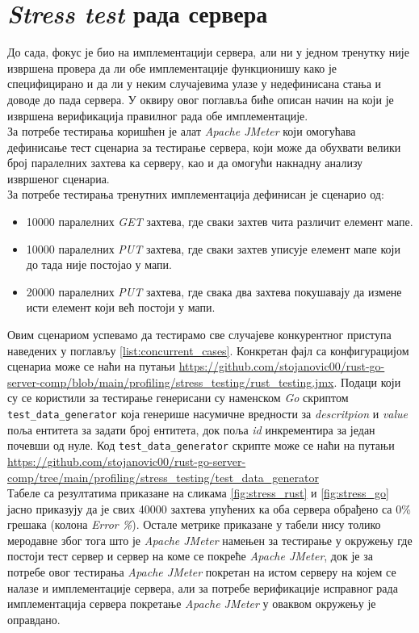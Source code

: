 \section{\textit{Stress test} рада сервера}

До сада, фокус је био на имплементацији сервера, али ни у једном тренутку није извршена провера да ли обе имплементације функционишу како је специфицирано и да ли у неким случајевима улазе у недефинисана стања и доводе до пада сервера. У оквиру овог поглавља биће описан начин на који је извршена верификација правилног рада обе имплементације.\\

За потребе тестирања коришћен је алат \textit{Apache JMeter} \cite{jmeter}који омогућава дефинисање тест сценариа за тестирање сервера, који може да обухвати велики број паралелних захтева ка серверу, као и да омогући накнадну анализу извршеног сценариа.\\

За потребе тестирања тренутних имплементација дефинисан је сценарио од:
\begin{itemize}
    \item 10000 паралелних \textit{GET}  захтева, где сваки захтев чита различит елемент мапе.
    \item 10000 паралелних \textit{PUT}  захтева, где сваки захтев уписује елемент мапе који до тада није постојао у мапи.
    \item 20000 паралелних \textit{PUT}  захтева, где свака два захтева покушавају да измене исти елемент који већ постоји у мапи.
\end{itemize}
Овим сценариом успевамо да тестирамо све случајеве конкурентног приступа наведених у поглављу \ref{list:concurrent_cases}. Конкретан фајл са конфигурацијом сценариа може се наћи на путањи \url{https://github.com/stojanovic00/rust-go-server-comp/blob/main/profiling/stress_testing/rust_testing.jmx}. Подаци који су се користили за тестирање генерисани су наменском \textit{Go} скриптом \verb|test_data_generator| која генерише насумичне вредности за \textit{descritpion}  и  \textit{value} поља ентитета за задати број ентитета, док поља \textit{id} инкрементира за један почевши од нуле. Код \verb|test_data_generator| скрипте може се наћи на путањи \url{https://github.com/stojanovic00/rust-go-server-comp/tree/main/profiling/stress_testing/test_data_generator}\\

Табеле са резултатима приказане на сликама \ref{fig:stress_rust} и \ref{fig:stress_go} јасно приказују да је свих 40000 захтева упућених ка оба сервера обрађено са 0\% грешака (колона \textit{Error \%}). Остале метрике приказане у табели нису толико меродавне због тога што је \textit{Apache JMeter} намењен за тестирање у окружењу где постоји тест сервер и сервер на коме се покреће \textit{Apache JMeter}, док је за потребе овог тестирања \textit{Apache JMeter} покретан на истом серверу на којем се налазе и имплементације сервера, али за потребе верификације исправног рада имплементација сервера покретање \textit{Apache JMeter} у оваквом окружењу је оправдано.

